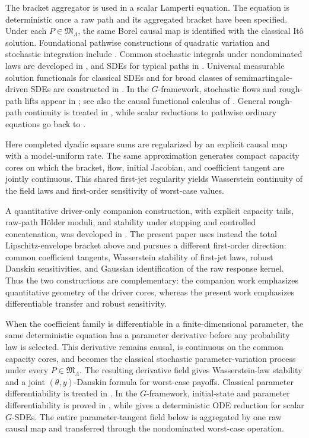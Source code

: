 \documentclass[11pt,reqno]{amsart}
\theoremstyle{plain}
\theoremstyle{definition}
\begin{document}
The bracket aggregator is used in a scalar Lamperti equation.  The equation
is deterministic once a raw path and its aggregated bracket have been
specified.  Under each \(P\in\mathfrak M_\Lambda\), the same Borel causal
map is identified with the classical It\^o solution.  Foundational pathwise
constructions of quadratic variation and stochastic integration include
\cite{Follmer81,Bichteler81,Karandikar95,ChiuCont18}.  Common stochastic
integrals under nondominated laws are developed in
\cite{SonerTouziZhang11,Nutz12}, and SDEs for typical paths in
\cite{BartlKupperNeufeld19}.  Universal measurable solution functionals for
classical SDEs and for broad classes of semimartingale-driven SDEs are
constructed in \cite{Kallenberg96,PrzybylowiczEtAl24}.  In the
\(G\)-framework, stochastic flows and rough-path lifts appear in
\cite{Gao09,GengQianYang14}; see also the causal functional calculus of
\cite{ChiuCont22}.  General rough-path continuity is treated in
\cite{Lyons98,FrizHairer20}, while scalar reductions to pathwise ordinary
equations go back to \cite{Lamperti64,Doss77,Sussmann78}.

Here completed dyadic square sums are regularized by an explicit causal map
with a model-uniform rate.  The same approximation generates compact
capacity cores on which the bracket, flow, initial Jacobian, and coefficient
tangent are jointly continuous.  This shared first-jet regularity yields
Wasserstein continuity of the field laws and first-order sensitivity of
worst-case values.

A quantitative driver-only companion construction, with explicit capacity
tails, raw-path H\"older moduli, and stability under stopping and controlled
concatenation, was developed in \cite{ZhaoDriverOnly26}.  The present paper
uses instead the total Lipschitz-envelope bracket above and pursues a different
first-order direction: common coefficient tangents, Wasserstein stability of
first-jet laws, robust Danskin sensitivities, and Gaussian identification of
the raw response kernel.  Thus the two constructions are complementary: the
companion work emphasizes quantitative geometry of the driver cores, whereas
the present work emphasizes differentiable transfer and robust sensitivity.

When the coefficient family is differentiable in a finite-dimensional
parameter, the same deterministic equation has a parameter derivative before
any probability law is selected.  This derivative remains causal, is
continuous on the common capacity cores, and becomes the classical stochastic
parameter-variation process under every \(P\in\mathfrak M_\Lambda\).  The
resulting derivative field gives Wasserstein-law stability and a joint
\((\theta,y)\)-Danskin formula for worst-case payoffs.
Classical parameter differentiability is treated in \cite{Metivier82}.  In
the \(G\)-framework, initial-state and parameter differentiability is proved
in \cite{Lin13}, while \cite{LuoWang14} gives a deterministic ODE reduction
for scalar \(G\)-SDEs.  The entire parameter-tangent field below is aggregated
by one raw causal map and transferred through the nondominated worst-case
operation.
\end{document}
